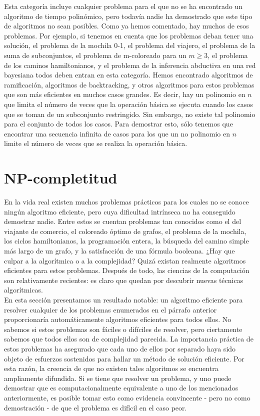 Esta categoría incluye cualquier problema para el que no se ha encontrado un algoritmo de tiempo polinómico, pero todavía nadie ha demostrado que este tipo de algoritmos no sean posibles. Como ya hemos comentado, hay muchos de esos problemas. Por ejemplo, si tenemos en cuenta que los problemas deban tener una solución, el problema de la mochila 0-1, el problema del viajero, el problema de la suma de subconjuntos, el problema de m-coloreado para un $m \geq 3$, el problema de los caminos hamiltonianos, y el problema de la inferencia abductiva en una red bayesiana todos deben entran en esta categoría. Hemos encontrado algoritmos de ramificación, algoritmos de backtracking, y otros algoritmos para estos problemas que son más eficientes en muchos casos grandes. Es decir, hay un polinomio en $n$ que limita el número de veces que la operación básica se ejecuta cuando los casos que se toman de un subconjunto restringido. Sin embargo, no existe tal polinomio para el conjunto de todos los casos. Para demostrar esto, sólo tenemos que encontrar una secuencia infinita de casos para los que un no polinomio en $n$ limite el número de veces que se realiza la operación básica.\\

\section{NP-completitud}\label{sec:NP-section}

En la vida real existen muchos problemas prácticos para los cuales no se conoce ningún algoritmo eficiente, pero cuya dificultad intrínseca no ha conseguido demostrar nadie. Entre estos se cuentan problemas tan conocidos como el del viajante de comercio, el coloreado óptimo de grafos, el problema de la mochila, los ciclos hamiltonianos, la programación entera, la búsqueda del camino simple más largo de un grafo, y la satisfacción de una fórmula booleana. ¿Hay que culpar a la algorítmica o a la complejidad? Quizá existan realmente algoritmos eficientes para estos problemas. Después de todo, las ciencias de la computación son relativamente recientes: es claro que quedan por descubrir nuevas técnicas algorítmicas.\\

En esta sección presentamos un resultado notable: un algoritmo eficiente para resolver cualquier de los problemas enumerados en el párrafo anterior proporcionaría automáticamente algoritmos eficientes para todos ellos. No sabemos si estos problemas son fáciles o difíciles de resolver, pero ciertamente sabemos que todos ellos son de complejidad parecida. La importancia práctica de estos problemas ha asegurado que cada uno de ellos por separado haya sido objeto de esfuerzos sostenidos para hallar un método de solución eficiente. Por esta razón, la creencia de que no existen tales algoritmos se encuentra ampliamente difundida. Si se tiene que resolver un problema, y uno puede demostrar que es computacionalmente equivalente a uno de los mencionados anteriormente, es posible tomar esto como evidencia convincente - pero no como demostración - de que el problema es difícil en el caso peor. \\


